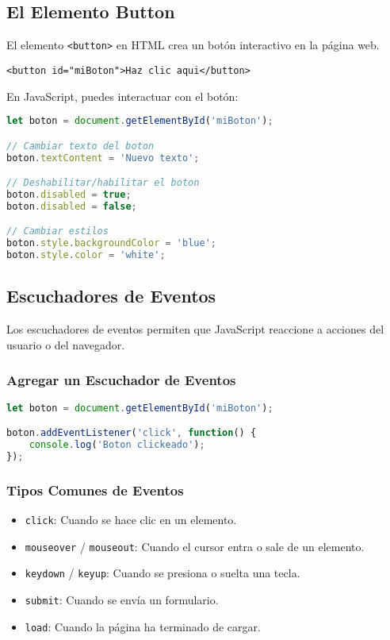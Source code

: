 \documentclass{book}
\begin{document}
\subsection{El Elemento Button}

El elemento \texttt{<button>} en HTML crea un botón interactivo en la página web.

\begin{lstlisting}[language=HTML5]
<button id="miBoton">Haz clic aqui</button>
\end{lstlisting}

En JavaScript, puedes interactuar con el botón:

\begin{lstlisting}[language=JavaScript]
let boton = document.getElementById('miBoton');

// Cambiar texto del boton
boton.textContent = 'Nuevo texto';

// Deshabilitar/habilitar el boton
boton.disabled = true;
boton.disabled = false;

// Cambiar estilos
boton.style.backgroundColor = 'blue';
boton.style.color = 'white';
\end{lstlisting}

\subsection{Escuchadores de Eventos}

Los escuchadores de eventos permiten que JavaScript reaccione a acciones del usuario o del navegador.

\subsubsection{Agregar un Escuchador de Eventos}

\begin{lstlisting}[language=JavaScript]
let boton = document.getElementById('miBoton');

boton.addEventListener('click', function() {
    console.log('Boton clickeado');
});
\end{lstlisting}

\subsubsection{Tipos Comunes de Eventos}

\begin{itemize}
    \item \texttt{click}: Cuando se hace clic en un elemento.
    \item \texttt{mouseover} / \texttt{mouseout}: Cuando el cursor entra o sale de un elemento.
    \item \texttt{keydown} / \texttt{keyup}: Cuando se presiona o suelta una tecla.
    \item \texttt{submit}: Cuando se envía un formulario.
    \item \texttt{load}: Cuando la página ha terminado de cargar.
\end{itemize}
\end{document}
